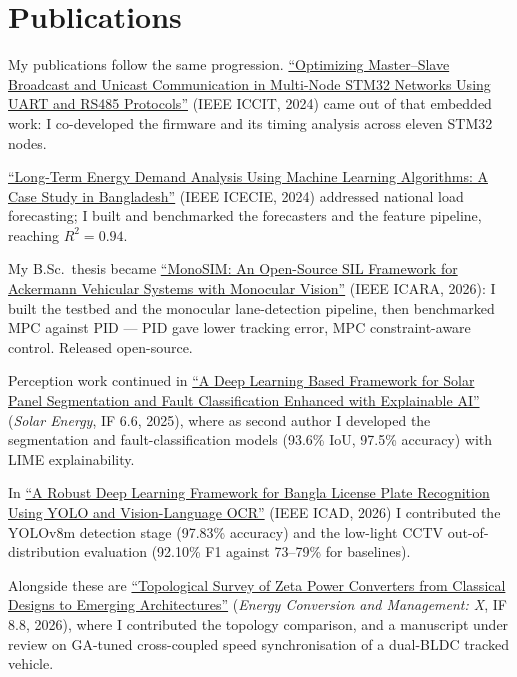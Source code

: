 \documentclass[11pt,a4paper]{article}
\begin{document}
\section*{Publications}

My publications follow the same progression. \href{https://doi.org/10.1109/ICCIT64611.2024.11022430}{``Optimizing Master--Slave Broadcast and Unicast Communication in Multi-Node STM32 Networks Using UART and RS485 Protocols''} (IEEE ICCIT, 2024) came out of that embedded work: I co-developed the firmware and its timing analysis across eleven STM32 nodes.

\href{https://doi.org/10.1109/ICECIE63774.2024.10815643}{``Long-Term Energy Demand Analysis Using Machine Learning Algorithms: A Case Study in Bangladesh''} (IEEE ICECIE, 2024) addressed national load forecasting; I built and benchmarked the forecasters and the feature pipeline, reaching $R^2 = 0.94$.

My B.Sc.\ thesis became \href{https://doi.org/10.1109/ICARA69401.2026.11480327}{``MonoSIM: An Open-Source SIL Framework for Ackermann Vehicular Systems with Monocular Vision''} (IEEE ICARA, 2026): I built the testbed and the monocular lane-detection pipeline, then benchmarked MPC against PID --- PID gave lower tracking error, MPC constraint-aware control. Released open-source.

Perception work continued in \href{https://doi.org/10.1016/j.solener.2025.114058}{``A Deep Learning Based Framework for Solar Panel Segmentation and Fault Classification Enhanced with Explainable AI''} (\textit{Solar Energy}, IF 6.6, 2025), where as second author I developed the segmentation and fault-classification models (93.6\% IoU, 97.5\% accuracy) with LIME explainability.

In \href{https://doi.org/10.1109/ICAD69378.2026.11608728}{``A Robust Deep Learning Framework for Bangla License Plate Recognition Using YOLO and Vision-Language OCR''} (IEEE ICAD, 2026) I contributed the YOLOv8m detection stage (97.83\% accuracy) and the low-light CCTV out-of-distribution evaluation (92.10\% F1 against 73--79\% for baselines).

Alongside these are \href{https://doi.org/10.1016/j.ecmx.2026.102222}{``Topological Survey of Zeta Power Converters from Classical Designs to Emerging Architectures''} (\textit{Energy Conversion and Management: X}, IF 8.8, 2026), where I contributed the topology comparison, and a manuscript under review on GA-tuned cross-coupled speed synchronisation of a dual-BLDC tracked vehicle.
\end{document}
